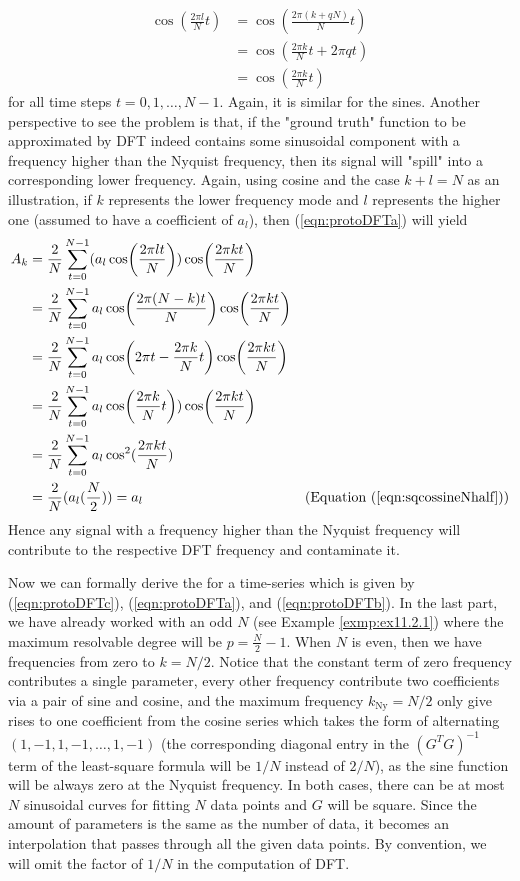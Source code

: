 \begin{align*}
\cos(\frac{2\pi l}{N} t) &= \cos(\frac{2\pi (k + qN)}{N} t) \\
&= \cos(\frac{2\pi k}{N} t + 2\pi q t) \\
&= \cos(\frac{2\pi k}{N} t)
\end{align*}
for all time steps $t = 0,1,\ldots,N-1$. Again, it is similar for the sines. Another perspective to see the problem is that, if the "ground truth" function to be approximated by DFT indeed contains some sinusoidal component with a frequency higher than the Nyquist frequency, then its signal will "spill" into a corresponding lower frequency. Again, using cosine and the case $k + l = N$ as an illustration, if $k$ represents the lower frequency mode and $l$ represents the higher one (assumed to have a coefficient of $a_l$), then (\ref{eqn:protoDFTa}) will yield
\begin{align*}
A_k &= \frac{2}{N}\sum_{t=0}^{N-1} (a_l\cos(\frac{2\pi lt}{N})) \cos(\frac{2\pi kt}{N}) \\
&= \frac{2}{N}\sum_{t=0}^{N-1} a_l\cos(\frac{2\pi (N-k)t}{N}) \cos(\frac{2\pi kt}{N}) \\
&= \frac{2}{N}\sum_{t=0}^{N-1} a_l\cos(2\pi t - \frac{2\pi k}{N} t) \cos(\frac{2\pi kt}{N}) \\
&= \frac{2}{N}\sum_{t=0}^{N-1} a_l\cos(\frac{2\pi k}{N} t)) \cos(\frac{2\pi kt}{N}) \\
&= \frac{2}{N}\sum_{t=0}^{N-1} a_l \cos^2(\frac{2\pi kt}{N}) \\
&= \frac{2}{N} (a_l (\frac{N}{2})) = a_l & \text{(Equation (\ref{eqn:sqcossineNhalf}))} 
\end{align*}
Hence any signal with a frequency higher than the Nyquist frequency will contribute to the respective DFT frequency and contaminate it.\par

Now we can formally derive the  for a time-series which is given by (\ref{eqn:protoDFTc}), (\ref{eqn:protoDFTa}), and (\ref{eqn:protoDFTb}). In the last part, we have already worked with an odd $N$ (see Example \ref{exmp:ex11.2.1}) where the maximum resolvable degree will be $p = \frac{N}{2} - 1$. When $N$ is even, then we have frequencies from zero to $k = N/2$. Notice that the constant term of zero frequency contributes a single parameter, every other frequency contribute two coefficients via a pair of sine and cosine, and the maximum frequency $k_{\text{Ny}} = N/2$ only give rises to one coefficient from the cosine series which takes the form of alternating $(1,-1,1,-1,\ldots,1,-1)$ (the corresponding diagonal entry in the $(G^TG)^{-1}$ term of the least-square formula will be $1/N$ instead of $2/N$), as the sine function will be always zero at the Nyquist frequency. In both cases, there can be at most $N$ sinusoidal curves for fitting $N$ data points and $G$ will be square. Since the amount of parameters is the same as the number of data, it becomes an interpolation that passes through all the given data points. By convention, we will omit the factor of $1/N$ in the computation of DFT.

